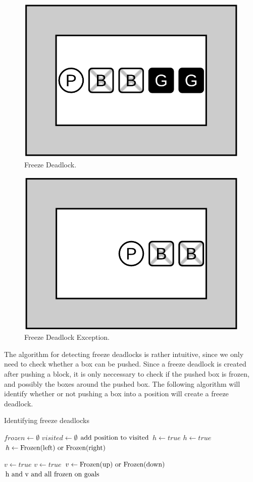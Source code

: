 \documentclass[times, 10pt,twocolumn]{article}
\begin{document}
\begin{figure}[h] 
  \centering
     \includegraphics[width=0.5\linewidth]{images/freeze_deadlock.png}
  \caption{Freeze Deadlock.}
  \label{fig:f}
\end{figure}

\begin{figure}[h] 
  \centering
     \includegraphics[width=0.5\linewidth]{images/freeze_deadlock_ok.png}
  \caption{Freeze Deadlock Exception.}
  \label{fig:fok}
\end{figure}

The algorithm for detecting freeze deadlocks is rather intuitive, since we only need to check whether a box can be pushed. Since a freeze deadlock is created after pushing a block, it is only neccessary to check if the pushed box is frozen, and possibly the boxes around the pushed box. The following algorithm will identify whether or not pushing a box into a position will create a freeze deadlock. \cite{Wiki}

\begin{algorithm}
  \caption{Identifying freeze deadlocks}
\begin{algorithmic}[1]
  \State $frozen \gets \emptyset$
  \State $visited \gets \emptyset$
    \State $\textnormal{add position to visited}$
      \State $h\gets true$
      \State $h\gets true$
      \State $h\gets \textnormal{Frozen(left) or Frozen(right)}$
    \EndIf

      \State $v\gets true$
      \State $v\gets true$
      \State $v\gets \textnormal{Frozen(up) or Frozen(down)}$
    \EndIf
    \State \Return $\textnormal{h and v and all frozen on goals}$
  \EndFunction
  \end{algorithmic}
\end{algorithm}
\end{document}
